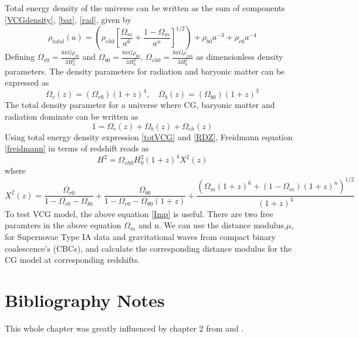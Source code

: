 Total energy density of the universe can be written as the sum of components \ref{VCGdensity}, \ref{bar}, \ref{rad}, given by
\begin{equation}\label{totVCG}
    \rho_{total}(a)=\left(\rho_{c h 0}\left[\frac{\Omega_{m}}{a^{6}}+\frac{1-\Omega_{m}}{a^{n}}\right]^{1 / 2}\right) + \rho_{b0} a^{-3} + \rho_{r0}a^{-4}
\end{equation}
Defining $\Omega_{r0} = \frac{8 \pi G\rho_{r0}}{3H_0 ^2}$ and $\Omega_{b0} = \frac{8 \pi G\rho_{b0}}{3H_0 ^2}$, $\Omega_{ch0} = \frac{8 \pi G\rho_{ch0}}{3H_0 ^2}$ as dimensionless density parameters. The density parameters for radiation and baryonic matter can be expressed as
\begin{equation}
    \Omega_{r}(z)=\left(\Omega_{r0}\right)(1+z)^{4}, \quad \Omega_{b}(z)=\left(\Omega_{b0}\right)(1+z)^{3}
\end{equation}The total density parameter for a universe where CG, baryonic matter and radiation dominate can be written as
\begin{equation}
    1=\Omega_{r}(z)+\Omega_{b}(z)+\Omega_{e h}(z)
\end{equation}
Using total energy density expression \ref{totVCG} and \ref{RDZ}, Freidmann equation \ref{freidmann} in terms of redshift reads as
\begin{equation}
    H^2=\Omega_{ch0} H_0^2 (1+z)^4 X^2(z)
\end{equation}
where
\begin{equation}\label{Imp}
    X^{2}(z)=\frac{\Omega_{r 0}}{1-\Omega_{r 0}-\Omega_{b 0}}+\frac{\Omega_{b 0} }{1-\Omega_{r 0}-\Omega_{\theta 0}(1+z)}+\frac{\left(\Omega_{m}(1+z)^6+(1-\Omega_{m})(1+z)^n\right)^{1 / 2}}{(1+z)^4}
\end{equation}
To test VCG model, the above equation \ref{Imp} is useful. There are two free paramters in the above equation $\Omega_m$ and n. We can use the distance modulus,$\mu$, for Supernovae Type IA data and gravitational waves from compact binary coalescence's (CBCs), and calculate the corresponding distance modulus for the CG model at corresponding redshifts.















\section{Bibliography Notes}
This whole chapter was greatly influenced by chapter 2 from \citep{bertibangalore} and \citep{carroll2019spacetime}.





